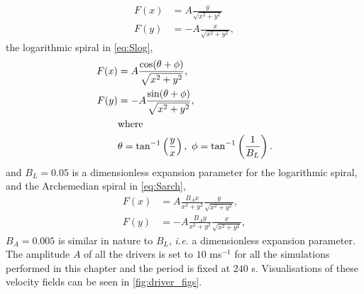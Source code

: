 \begin{subequations}
	\begin{align}
		F(x) &= A \frac{y}{\sqrt{x^2 + y^2}}\\
		F(y) &= - A \frac{x}{\sqrt{x^2 + y^2}},
	\end{align}
	\label{eq:Suni}
\end{subequations}
the logarithmic spiral in \cref{eq:Slog},
\begin{subequations}
	\begin{align}
		F(x) &= A \frac{\cos(\theta + \phi)}{\sqrt{x^2 + y^2}},\\
		F(y) &= - A \frac{\sin(\theta + \phi)}{\sqrt{x^2 + y^2}},\\
			&\text{where}\notag\\
			&\theta = \tan^{-1}\left(\frac{y}{x}\right),\ \phi = \tan^{-1}\left(\frac{1}{B_L}\right).\notag	
	\end{align}
	\label{eq:Slog}
\end{subequations}
and $B_L = 0.05$ is a dimensionless expansion parameter for the logarithmic spiral, and the Archemedian spiral in \cref{eq:Sarch},
\begin{subequations}
	\begin{align}
		F(x) &= A \frac{B_Ax}{x^2 + y^2} \frac{y}{\sqrt{x^2 + y^2}},\\
		F(y) &= - A \frac{B_Ay}{x^2 + y^2} \frac{x}{\sqrt{x^2 + y^2}},
	\end{align}
	\label{eq:Sarch}
\end{subequations}
$B_A = 0.005$ is similar in nature to $B_L$, \textit{i.e.} a dimensionless expansion parameter.
The amplitude $A$ of all the drivers is set to $10$ ms$^{-1}$ for all the simulations performed in this chapter and the period is fixed at $240$ s.
Visualisations of these velocity fields can be seen in \cref{fig:driver_figs}.

